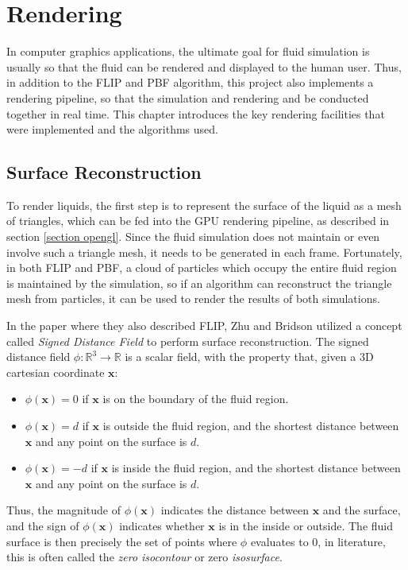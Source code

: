 \chapter{Rendering}
\label{chapter render}
In computer graphics applications, the ultimate goal for fluid simulation is usually so that the fluid can be rendered and displayed to the human user. Thus, in addition to the FLIP and PBF algorithm, this project also implements a rendering pipeline, so that the simulation and rendering and be conducted together in real time. This chapter introduces the key rendering facilities that were implemented and the algorithms used.

\section{Surface Reconstruction}
\label{section surface reconstruction}
To render liquids, the first step is to represent the surface of the liquid as a mesh of triangles, which can be fed into the GPU rendering pipeline, as described in section \ref{section opengl}. Since the fluid simulation does not maintain or even involve such a triangle mesh, it needs to be generated in each frame. Fortunately, in both FLIP and PBF, a cloud of particles which occupy the entire fluid region is maintained by the simulation, so if an algorithm can reconstruct the triangle mesh from particles, it can be used to render the results of both simulations.

In the paper where they also described FLIP\cite{zhu2005animating}, Zhu and Bridson utilized a concept called \textit{Signed Distance Field} to perform surface reconstruction. The signed distance field $\phi : \mathbb{R} ^3 \rightarrow \mathbb{R}$  is a scalar field, with the property that, given a 3D cartesian coordinate $\textbf{x}$:
\begin{itemize}
    \item $\phi(\textbf{x}) = 0$ if $\textbf{x}$ is on the boundary of the fluid region.
    
    \item $\phi(\textbf{x}) = d$ if $\textbf{x}$ is outside the fluid region, and the shortest distance between $\textbf{x}$ and any point on the surface is $d$.
    
    \item $\phi(\textbf{x}) = -d$ if $\textbf{x}$ is inside the fluid region, and the shortest distance between $\textbf{x}$ and any point on the surface is $d$.
\end{itemize}
Thus, the magnitude of $\phi(\textbf{x})$ indicates the distance between $\textbf{x}$ and the surface, and the sign of $\phi(\textbf{x})$ indicates whether $\textbf{x}$ is in the inside or outside. The fluid surface is then precisely the set of points where $\phi$ evaluates to 0, in literature, this is often called the \textit{zero isocontour} or zero \textit{isosurface}.

